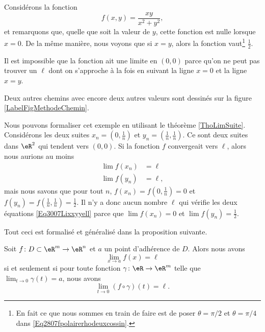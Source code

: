 \newcommand{\CaptionFigMethodeChemin}{Sur toute la droite $y=-x$, la fonction vaut $-1/2$, tandis que sur toute la droite $y=x/2$, elle vaut $\frac{2}{ 5 }$. Il est donc impossible que la fonction ait une limite en $(0,0)$, parce que dans toute boule autour de zéro, il y aura toujours un point de chacune de ces deux droites.}
	

\begin{example}		\label{ExFNExempleMethodeTrigigi}
	Considérons la fonction
	\begin{equation}
		f(x,y)=\frac{ xy }{ x^2+y^2 },
	\end{equation}
	et remarquons que, quelle que soit la valeur de $y$, cette fonction est nulle lorsque $x=0$. De la même manière, nous voyons que si $x=y$, alors la fonction vaut\footnote{En fait ce que nous sommes en train de faire est de poser $\theta=\pi/2$ et $\theta=\pi/4$ dans \eqref{Eq2807fpolairerhodeuxcossin}.} $\frac{ 1 }{2}$. 

	Il est impossible que la fonction ait une limite en $(0,0)$ parce qu'on ne peut pas trouver un $\ell$ dont on s'approche à la fois en suivant la ligne $x=0$ et la ligne $x=y$.

	Deux autres chemins avec encore deux autres valeurs sont dessinés sur la figure \ref{LabelFigMethodeChemin}.

\end{example}

Nous pouvons formaliser cet exemple en utilisant le théorème \ref{ThoLimSuite}. Considérons les deux suites $x_n=(0,\frac{1}{ n })$ et $y_n=(\frac{1}{ n },\frac{1}{ n })$. Ce sont deux suites dans $\eR^2$ qui tendent vers $(0,0)$. Si la fonction $f$ convergeait vers $\ell$, alors nous aurions au moins
\begin{subequations}\label{Eq3007Lixxyyell}
	\begin{align}
		\lim f(x_n)&=\ell\\
		\lim f(y_n)&=\ell,
	\end{align}
\end{subequations}
mais nous savons que pour tout $n$, $f(x_n)=f(0,\frac{1}{ n })=0$ et $f(y_n)=f(\frac{1}{ n },\frac{1}{ n })=\frac{1}{ 2 }$. Il n'y a donc aucun nombre $\ell$ qui vérifie les deux équations \eqref{Eq3007Lixxyyell} parce que $\lim f(x_n)=0$ et $\lim f(y_n)=\frac{ 1 }{2}$.

Tout ceci est formalisé et généralisé dans la proposition suivante.
\begin{proposition}     \label{PROPooSAFIooWvmSiT}
	Soit $f\colon D\subset\eR^m\to \eR^n$ et $a$ un point d'adhérence de $D$. Alors nous avons
	\begin{equation}
		\lim_{x\to a} f(x)=\ell
	\end{equation}
	si et seulement si pour toute fonction $\gamma\colon \eR\to \eR^m$ telle que $\lim_{t\to 0} \gamma(t)=a$, nous avons
	\begin{equation}
		\lim_{t\to 0} (f\circ\gamma)(t)=\ell.
	\end{equation}	
\end{proposition}

